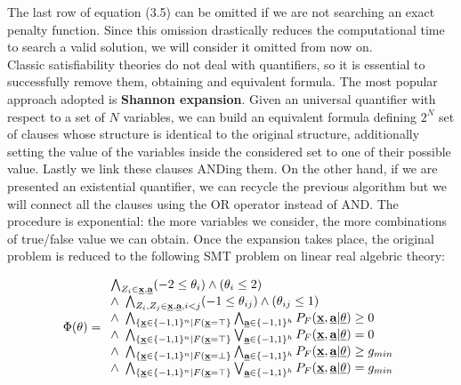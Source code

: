 The last row of equation (3.5) can be omitted if we are not searching an exact penalty function. Since this omission drastically reduces the computational time to search a valid solution, we will consider it omitted from now on. \\
Classic satisfiability theories do not deal with quantifiers, so it is essential to successfully remove them, obtaining and equivalent formula. The most popular approach adopted is \textbf{Shannon expansion}. Given an universal quantifier with respect to a set of $N$ variables, we can build an equivalent formula defining $2^N$ set of clauses whose structure is identical to the original structure, additionally setting the value of the variables inside the considered set to one of their possible value. Lastly we link these clauses ANDing them. On the other hand, if we are presented an existential quantifier, we can recycle the previous algorithm but we will connect all the clauses using the OR operator instead of AND. The procedure is exponential: the more variables we consider, the more combinations of true/false value we can obtain. Once the expansion takes place, the original problem is reduced to the following SMT problem on linear real algebric theory:

\begin{equation}
    \Phi(\theta) =
        \begin{array}{lr}
            \bigwedge_{Z_i\in\textbf{\underline{x}},\textbf{\underline{a}}}(-2\leq\theta_i) \land (\theta_i\leq 2) \\
            \land\  \bigwedge_{Z_i,Z_j\in\textbf{\underline{x}},\textbf{\underline{a}}, i<j}(-1\leq\theta_{ij}) \land (\theta_{ij}\leq 1) \\
            \land\ \bigwedge_{\{\textbf{\underline{x}}\in\{-1,1\}^n|F(\textbf{\underline{x}}=\top\}} \bigwedge_{\textbf{\underline{a}}\in\{-1,1\}^h}P_F(\underline{\textbf{x}},\underline{\textbf{a}} | \underline{\theta}) \geq 0 \\
            \land\ \bigwedge_{\{\textbf{\underline{x}}\in\{-1,1\}^n|F(\textbf{\underline{x}}=\top\}} \bigvee_{\textbf{\underline{a}}\in\{-1,1\}^h}P_F(\underline{\textbf{x}},\underline{\textbf{a}} | \underline{\theta}) = 0 \\
            \land\ \bigwedge_{\{\textbf{\underline{x}}\in\{-1,1\}^n|F(\textbf{\underline{x}}=\bot\}} \bigwedge_{\textbf{\underline{a}}\in\{-1,1\}^h}P_F(\underline{\textbf{x}},\underline{\textbf{a}} | \underline{\theta}) \geq g_{min} \\
            \land\ \bigwedge_{\{\textbf{\underline{x}}\in\{-1,1\}^n|F(\textbf{\underline{x}}=\top\}} \bigvee_{\textbf{\underline{a}}\in\{-1,1\}^h}P_F(\underline{\textbf{x}},\underline{\textbf{a}} | \underline{\theta}) = g_{min} \\
        \end{array}
\end{equation}

